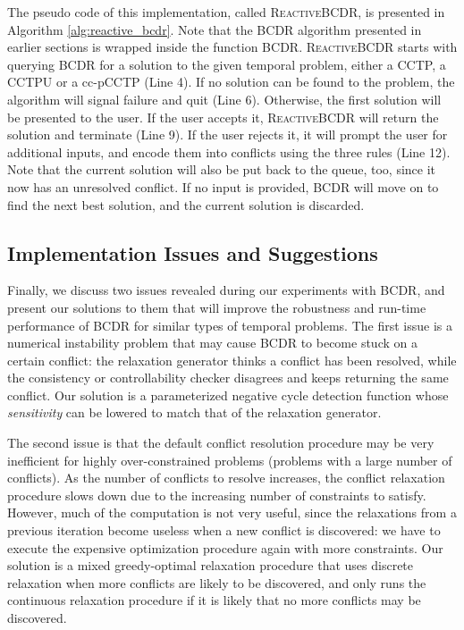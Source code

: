 \documentclass[jair,twoside,11pt,theapa]{article}
\begin{document}
The pseudo code of this implementation, called \textsc{ReactiveBCDR}, is
presented in Algorithm \ref{alg:reactive_bcdr}. Note that the BCDR algorithm
presented in earlier sections is wrapped inside the function \textsc{BCDR}.
\textsc{ReactiveBCDR} starts with querying \textsc{BCDR} for a solution to the
given temporal problem, either a CCTP, a CCTPU or a cc-pCCTP (Line 4). If no
solution can be found to the problem, the algorithm will signal failure and
quit (Line 6). Otherwise, the first solution will be presented to the user. If
the user accepts it, \textsc{ReactiveBCDR} will return the solution and
terminate (Line 9). If the user rejects it, it will prompt the user for
additional inputs, and encode them into conflicts using the three rules (Line
12). Note that the current solution will also be put back to the queue, too,
since it now has an unresolved conflict. If no input is provided, BCDR will move
on to find the next best solution, and the current solution is discarded.





\subsection{Implementation Issues and Suggestions}


Finally, we discuss two issues revealed during our experiments with BCDR, and
present our solutions to them that will improve the robustness and run-time
performance of BCDR for similar types of temporal problems. The first issue is a
numerical instability problem that may cause BCDR to become stuck on a certain
conflict: the relaxation generator thinks a conflict has been resolved, while
the consistency or controllability checker disagrees and keeps returning the
same conflict. Our solution is a parameterized negative cycle detection function
whose \textit{sensitivity} can be lowered to match that of the relaxation generator.


The second issue is that the default conflict resolution procedure may be very
inefficient for highly over-constrained problems (problems with a large number
of conflicts). As the number of conflicts to resolve increases, the conflict
relaxation procedure slows down due to the increasing number of constraints to
satisfy. However, much of the computation is not very useful, since the
relaxations from a previous iteration become useless when a new conflict is
discovered: we have to execute the expensive optimization procedure again with
more constraints. Our solution is a mixed greedy-optimal relaxation
procedure that uses discrete relaxation when more conflicts are likely to be
discovered, and only runs the continuous relaxation procedure if it is likely
that no more conflicts may be discovered.
\end{document}
